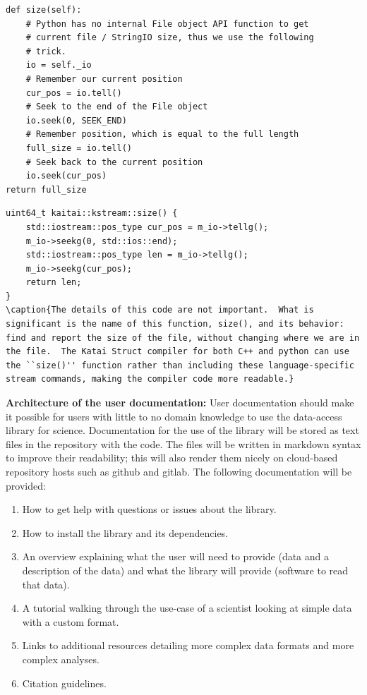 \begin{lstlisting}
def size(self):
    # Python has no internal File object API function to get
    # current file / StringIO size, thus we use the following
    # trick.
    io = self._io
    # Remember our current position
    cur_pos = io.tell()
    # Seek to the end of the File object
    io.seek(0, SEEK_END)
    # Remember position, which is equal to the full length
    full_size = io.tell()
    # Seek back to the current position
    io.seek(cur_pos)
return full_size
\end{lstlisting}

\begin{lstlisting}
uint64_t kaitai::kstream::size() {
    std::iostream::pos_type cur_pos = m_io->tellg();
    m_io->seekg(0, std::ios::end);
    std::iostream::pos_type len = m_io->tellg();
    m_io->seekg(cur_pos);
    return len;
}
\caption{The details of this code are not important.  What is significant is the name of this function, size(), and its behavior: find and report the size of the file, without changing where we are in the file.  The Katai Struct compiler for both C++ and python can use the ``size()'' function rather than including these language-specific stream commands, making the compiler code more readable.}
\end{lstlisting}

\textbf{Architecture of the user documentation:} User documentation should make it possible for users with little to no domain knowledge to use the data-access library for science.  Documentation for the use of the library will be stored as text files in the repository with the code.  The files will be written in markdown syntax to improve their readability; this will also render them nicely on cloud-based repository hosts such as github and gitlab.  The following documentation will be provided:

\begin{enumerate}
    \item How to get help with questions or issues about the library.
    \item How to install the library and its dependencies.
    \item An overview explaining what the user will need to provide (data and a description of the data) and what the library will provide (software to read that data).
    \item A tutorial walking through the use-case of a scientist looking at simple data with a custom format.
    \item Links to additional resources detailing more complex data formats and more complex analyses.
    \item Citation guidelines.  
\end{enumerate}


